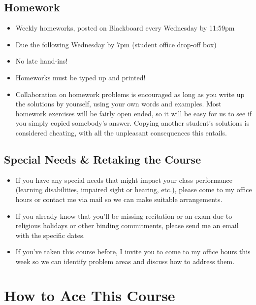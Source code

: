 \subsection{Homework}
\begin{itemize}
    \item Weekly homeworks, posted on Blackboard every Wednesday by 11:59pm
    \item Due the following Wednesday by 7pm (student office drop-off box)
    \item No late hand-ins!
    \item Homeworks must be typed up and printed!
    \item Collaboration on homework problems is encouraged as long as you write up the solutions by yourself, using your own words and examples.
        Most homework exercises will be fairly open ended, so it will be easy for us to see if you simply copied somebody's answer.
        Copying another student's solutions is considered cheating, with all the unpleasant consequences this entails.
\end{itemize}

\subsection{Special Needs \& Retaking the Course}
\begin{itemize}
    \item If you have any special needs that might impact your class performance (learning disabilities, impaired sight or hearing, etc.), please come to my office hours or contact me via mail so we can make suitable arrangements.
    \item If you already know that you'll be missing recitation or an exam due to religious holidays or other binding commitments, please send me an email with the specific dates.
    \item If you've taken this course before, I invite you to come to my office hours this week so we can identify problem areas and discuss how to address them.
\end{itemize}

\section{How to Ace This Course}

